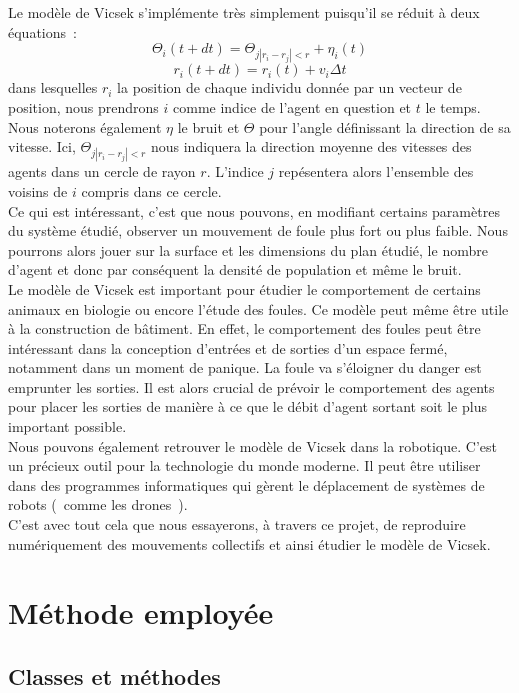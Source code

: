 \documentclass[french, a4paper, 12pt, openany]{report}
\begin{document}
	Le modèle de Vicsek s'implémente très simplement puisqu'il se réduit à deux équations~:
	\[
		\Theta_{i}(t+dt) = \Theta_{j |r_{i}-r_{j}|<r} + \eta_{i}(t)
	\]
	\[
		r_{i}(t+dt) = r_{i}(t) + v_{i}\Delta t
	\]
	dans lesquelles $r_{i}$ la position de chaque individu donnée par un vecteur de position, nous prendrons $i$ comme indice de l'agent en question et $t$ le temps. Nous noterons également $\eta$ le bruit et $\Theta$ pour l’angle définissant la direction de sa vitesse. Ici, $\Theta_{j |r_{i}-r_{j}|<r}$ nous indiquera la direction moyenne des vitesses des agents dans un cercle de rayon $r$. L'indice $j$ repésentera alors l'ensemble des voisins de $i$ compris dans ce cercle.\\

	Ce qui est intéressant, c'est que nous pouvons, en modifiant certains paramètres du système étudié, observer un mouvement de foule plus fort ou plus faible. Nous pourrons alors jouer sur la surface et les dimensions du plan étudié, le nombre d'agent et donc par conséquent la densité de population et même le bruit.\\

	Le modèle de Vicsek est important pour étudier le comportement de certains animaux en biologie ou encore l'étude des foules. Ce modèle peut même être utile à la construction de bâtiment. En effet, le comportement des foules peut être intéressant dans la conception d'entrées et de sorties d'un espace fermé, notamment dans un moment de panique. La foule va s'éloigner du danger est emprunter les sorties. Il est alors crucial de prévoir le comportement des agents pour placer les sorties de manière à ce que le débit d'agent sortant soit le plus important possible.\\
	
	Nous pouvons également retrouver le modèle de Vicsek dans la robotique. C'est un précieux outil pour la technologie du monde moderne. Il peut être utiliser dans des programmes informatiques qui gèrent le déplacement de systèmes de robots (~comme les drones~).\\ 

	C'est avec tout cela que nous essayerons, à travers ce projet, de reproduire numériquement des mouvements collectifs et ainsi étudier le modèle de Vicsek.
	
\chapter{Méthode employée}
\section{Classes et méthodes}
\end{document}
